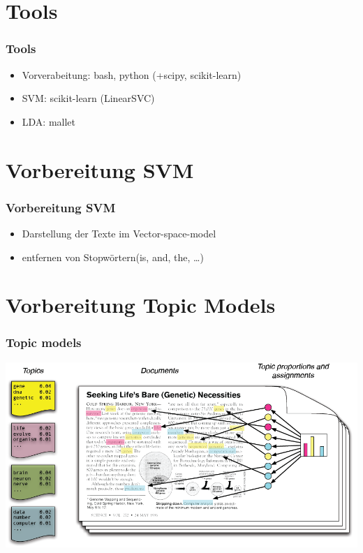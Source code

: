 \documentclass[12pt, xcolor=table]{beamer}
\begin{document}
\section{Tools}
\begin{frame}
    \frametitle{Tools}
    \begin{itemize}
        \item Vorverabeitung: bash, python (+scipy, scikit-learn)
        \item SVM: scikit-learn (LinearSVC)
        \item LDA: mallet
    \end{itemize}
\end{frame}

\section{Vorbereitung SVM}
\begin{frame}
    \frametitle{Vorbereitung SVM}
    \begin{itemize}
        \item Darstellung der Texte im Vector-space-model
        \item entfernen von Stopwörtern(is, and, the, \ldots)
    \end{itemize}
\end{frame}
\section{Vorbereitung Topic Models}
\begin{frame}
    \frametitle{Topic models}
    \begin{center}
        \includegraphics[scale=0.35]{figures/IntroToLDA.png}
    \end{center}
\end{frame}
\end{document}
